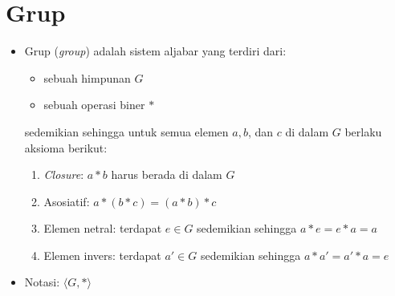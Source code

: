 \documentclass{article}
\begin{document}

\section*{Grup}

\begin{itemize}
    \item Grup (\textit{group}) adalah sistem aljabar yang terdiri dari:
    \begin{itemize}
        \item sebuah himpunan $G$
        \item sebuah operasi biner $*$
    \end{itemize}
    sedemikian sehingga untuk semua elemen $a, b$, dan $c$ di dalam $G$ berlaku aksioma berikut:
    \begin{enumerate}
        \item \textit{Closure}: $a * b$ harus berada di dalam $G$
        \item Asosiatif: $a * (b * c) = (a * b) * c$
        \item Elemen netral: terdapat $e \in G$ sedemikian sehingga $a * e = e * a = a$
        \item Elemen invers: terdapat $a' \in G$ sedemikian sehingga $a * a' = a' * a = e$
    \end{enumerate}
    \item Notasi: $\langle G, *\rangle$
\end{itemize}
\end{document}
